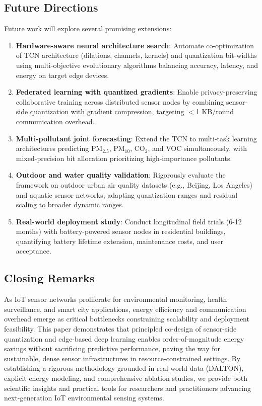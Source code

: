\subsection{Future Directions}

Future work will explore several promising extensions:

\begin{enumerate}
\item \textbf{Hardware-aware neural architecture search}: Automate co-optimization of TCN architecture (dilations, channels, kernels) and quantization bit-widths using multi-objective evolutionary algorithms balancing accuracy, latency, and energy on target edge devices.

\item \textbf{Federated learning with quantized gradients}: Enable privacy-preserving collaborative training across distributed sensor nodes by combining sensor-side quantization with gradient compression, targeting $<$1 KB/round communication overhead.

\item \textbf{Multi-pollutant joint forecasting}: Extend the TCN to multi-task learning architectures predicting PM$_{2.5}$, PM$_{10}$, CO$_2$, and VOC simultaneously, with mixed-precision bit allocation prioritizing high-importance pollutants.

\item \textbf{Outdoor and water quality validation}: Rigorously evaluate the framework on outdoor urban air quality datasets (e.g., Beijing, Los Angeles) and aquatic sensor networks, adapting quantization ranges and residual scaling to broader dynamic ranges.

\item \textbf{Real-world deployment study}: Conduct longitudinal field trials (6-12 months) with battery-powered sensor nodes in residential buildings, quantifying battery lifetime extension, maintenance costs, and user acceptance.
\end{enumerate}

\subsection{Closing Remarks}

As IoT sensor networks proliferate for environmental monitoring, health surveillance, and smart city applications, energy efficiency and communication overhead emerge as critical bottlenecks constraining scalability and deployment feasibility. This paper demonstrates that principled co-design of sensor-side quantization and edge-based deep learning enables order-of-magnitude energy savings without sacrificing predictive performance, paving the way for sustainable, dense sensor infrastructures in resource-constrained settings. By establishing a rigorous methodology grounded in real-world data (DALTON), explicit energy modeling, and comprehensive ablation studies, we provide both scientific insights and practical tools for researchers and practitioners advancing next-generation IoT environmental sensing systems.

